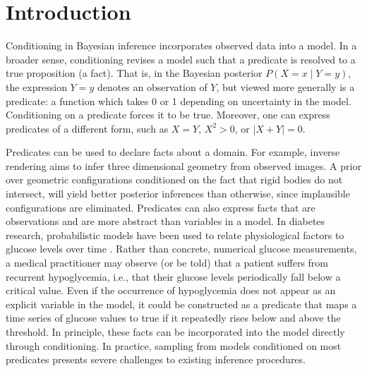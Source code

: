 
\section{Introduction}

Conditioning in Bayesian inference incorporates observed data into a model.
In a broader sense, conditioning revises a model such that a predicate is resolved to a true proposition (a fact).
That is, in the Bayesian posterior $P(X = x \mid Y = y)$, the expression $Y = y$ denotes an observation of $Y$, but viewed more generally is a predicate: a function which takes 0 or 1 depending on uncertainty in the model.
Conditioning on a predicate forces it to be true.
Moreover, one can express predicates of a different form, such as $X = Y$, $X^2 > 0$, or $|X + Y| = 0$.

Predicates can be used to declare facts about a domain. For example, inverse rendering  \cite{marschner1998inverse,kulkarni2015deep} aims to infer three dimensional geometry from observed images.
A prior over geometric configurations conditioned on the fact that rigid bodies do not intersect,  will yield better posterior inferences than otherwise, since implausible configurations are eliminated.
Predicates can also express facts that are observations and are more abstract than variables in a model.
In diabetes research, probabilistic models have been used to relate physiological factors to glucose levels over time \citep{levine2017offline,murata2004probabilistic}.
Rather than concrete, numerical glucose measurements, a medical practitioner may observe (or be told) that a patient suffers from recurrent hypoglycemia, i.e., that their glucose levels periodically fall below a critical value.
Even if the occurrence of hypoglycemia does not appear as an explicit variable in the model, it could be constructed as a predicate that maps a time series of glucose values to true if it repeatedly rises below and above the threshold.
In principle, these facts can be incorporated into the model directly through conditioning.	
In practice, sampling from models conditioned on most predicates presents severe challenges to existing inference procedures.


